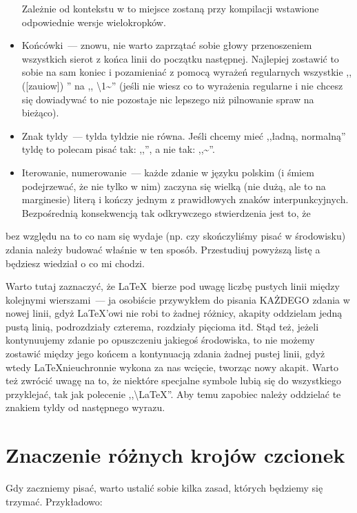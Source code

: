 \begin{itemize}
	Zależnie od kontekstu w to miejsce zostaną przy kompilacji wstawione odpowiednie wersje wielokropków.
	\item Końcówki~--- znowu, nie warto zaprzątać sobie głowy przenoszeniem wszystkich sierot z końca linii do początku następnej.
	Najlepiej zostawić to sobie na sam koniec i pozamieniać z pomocą wyrażeń regularnych wszystkie ,, ([zauiow]) '' na ,, \textbackslash1\textasciitilde'' (jeśli nie wiesz co to wyrażenia regularne i nie chcesz się dowiadywać to nie pozostaje nic lepszego niż pilnowanie spraw na bieżąco).
	\item Znak tyldy~--- tylda tyldzie nie równa.
	Jeśli chcemy mieć ,,ładną, normalną'' tyldę to polecam pisać tak: ,,\textapprox'', a nie tak: ,,\textasciitilde''.
	\item Iterowanie, numerowanie~--- każde zdanie w języku polskim (i śmiem podejrzewać, że nie tylko w nim) zaczyna się wielką (nie dużą, ale to na marginesie) literą i kończy jednym z prawidłowych znaków interpunkcyjnych.
	Bezpośrednią konsekwencją tak odkrywczego stwierdzenia jest to, że
\end{itemize}
bez względu na to co nam się wydaje (np. czy skończyliśmy pisać w środowisku) zdania należy budować właśnie w ten sposób.
Przestudiuj powyższą listę a będziesz wiedział o co mi chodzi.

Warto tutaj zaznaczyć, że \LaTeX~bierze pod uwagę liczbę pustych linii między kolejnymi wierszami~--- ja osobiście przywykłem do pisania KAŻDEGO zdania w nowej linii, gdyż \LaTeX'owi nie robi to żadnej różnicy, akapity oddzielam jedną pustą linią, podrozdziały czterema, rozdziały pięcioma itd.
Stąd też, jeżeli kontynuujemy zdanie po opuszczeniu jakiegoś środowiska, to nie możemy zostawić między jego końcem a kontynuacją zdania żadnej pustej linii, gdyż wtedy \LaTeX nieuchronnie wykona za nas wcięcie, tworząc nowy akapit.
Warto też zwrócić uwagę na to, że niektóre specjalne symbole lubią się do wszystkiego przyklejać, tak jak polecenie ,,\textbackslash LaTeX''.
Aby temu zapobiec należy oddzielać te znakiem tyldy od następnego wyrazu.




\section{Znaczenie różnych krojów czcionek}




Gdy zaczniemy pisać, warto ustalić sobie kilka zasad, których będziemy się trzymać.
Przykładowo:

